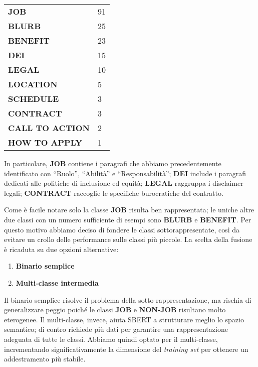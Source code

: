 \begin{center}
\begin{tabular}{ll}
\textbf{JOB} & 91 \\
\textbf{BLURB} & 25 \\
\textbf{BENEFIT} & 23 \\
\textbf{DEI} & 15 \\
\textbf{LEGAL} & 10 \\
\textbf{LOCATION} & 5 \\
\textbf{SCHEDULE} & 3 \\
\textbf{CONTRACT} & 3 \\
\textbf{CALL TO ACTION} & 2 \\
\textbf{HOW TO APPLY} & 1 \\
\end{tabular}
\end{center}

\noindent In particolare, \textbf{JOB} contiene i paragrafi che abbiamo precedentemente identificato con ``Ruolo'', ``Abilità'' e ``Responsabilità''; \textbf{DEI} include i paragrafi dedicati alle politiche di inclusione ed equità; \textbf{LEGAL} raggruppa i disclaimer legali; \textbf{CONTRACT} raccoglie le specifiche burocratiche del contratto.

\noindent Come è facile notare solo la classe \textbf{JOB} risulta ben rappresentata; le uniche altre due classi con un numero sufficiente di esempi sono \textbf{BLURB} e \textbf{BENEFIT}. Per questo motivo abbiamo deciso di fondere le classi sottorappresentate, così da evitare un crollo delle performance sulle classi più piccole. La scelta della fusione è ricaduta su due opzioni alternative:

\begin{enumerate}
    \item \textbf{Binario semplice}
    \item \textbf{Multi-classe intermedia}
\end{enumerate}

\noindent Il binario semplice risolve il problema della sotto-rappresentazione, ma rischia di generalizzare peggio poiché le classi \textbf{JOB} e \textbf{NON-JOB} risultano molto eterogenee. Il multi-classe, invece, aiuta SBERT a strutturare meglio lo spazio semantico; di contro richiede più dati per garantire una rappresentazione adeguata di tutte le classi. Abbiamo quindi optato per il multi-classe, incrementando significativamente la dimensione del \textit{training set} per ottenere un addestramento più stabile.

